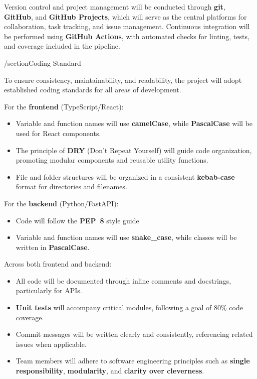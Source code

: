 \documentclass{article}
\begin{document}
Version control and project management will be conducted through
\textbf{git}, \textbf{GitHub}, and \textbf{GitHub Projects}, which will serve
as the central platforms for collaboration, task tracking, and issue
management. Continuous integration will be performed using
\textbf{GitHub Actions}, with automated checks for linting, tests, and coverage
included in the pipeline.

/section{Coding Standard}

\iffalse
\wss{What coding standard will you adopt?}
\fi

To ensure consistency, maintainability, and readability, the project will adopt
established coding standards for all areas of development.

For the \textbf{frontend} (TypeScript/React):
\begin{itemize}

\item Variable and function names will use \textbf{camelCase}, while
  \textbf{PascalCase} will be used for React components.
  \item The principle of \textbf{DRY} (Don’t Repeat Yourself) will guide code
  organization, promoting modular components and reusable utility functions.
  \item File and folder structures will be organized in a consistent
  \textbf{kebab-case} format for directories and filenames.
\end{itemize}

For the \textbf{backend} (Python/FastAPI):
\begin{itemize}
  \item Code will follow the \textbf{PEP~8} style guide
  \item Variable and function names will use \textbf{snake\_case}, while classes
  will be written in \textbf{PascalCase}.
\end{itemize}

Across both frontend and backend:
\begin{itemize}
  \item All code will be documented through inline comments and docstrings,
  particularly for APIs.
  \item \textbf{Unit tests} will accompany critical modules, following a goal of
  80\% code coverage.
  \item Commit messages will be written clearly and consistently, referencing
  related issues when applicable.
  \item Team members will adhere to software engineering principles such as
  \textbf{single responsibility}, \textbf{modularity}, and \textbf{clarity over
  cleverness}.
\end{itemize}
\end{document}
